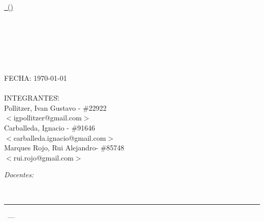 \begin{titlepage}
\begin{center}
\end{center}

\vfill

\begin{center}
\underline{\Large{\nombreMateria\, (\codigoMateria)}}
\end{center}

\vfill
\begin{center}

\end{center}
\vfill

\begin{center}
\Huge{\textsc{ \tituloTP }}\\[.5cm]
	\begin{figure}[H]
		\centering
	\end{figure}\HRule \\[0.1cm]
\Huge{\textbf{\descripcionTP}}\\[0.01cm]
\HRule\\[0.3cm]
\end{center}

\vfill



\begin{tabbing}
	FECHA: \today\\
\\
	INTEGRANTES:\hspace{-1cm}\=\+\hspace{1cm}\=\hspace{6cm}\=\\
		Pollitzer, Ivan Gustavo	\>\>- \#22922\\
			\>\footnotesize{$<$igpollitzer@gmail.com$>$}\\
		Carballeda, Ignacio	\>\>- \#91646\\
			\>\footnotesize{$<$carballeda.ignacio@gmail.com$>$}\\
		Marques Rojo, Rui Alejandro\>\>- \#85748\\
			\>\footnotesize{$<$rui.rojo@gmail.com$>$}\\			

\end{tabbing}

\begin{flushleft} \large
\emph{Docentes:}\\[.2cm]
\end{flushleft}
\begin{tabbing}
\docentes\\[.5cm]
\end{tabbing}

\vfill

\hrule
\vspace{0.2cm}

\noindent\small{\codigoMateria\, --- \nombreMateria \hfill \facultad}

\end{titlepage}
